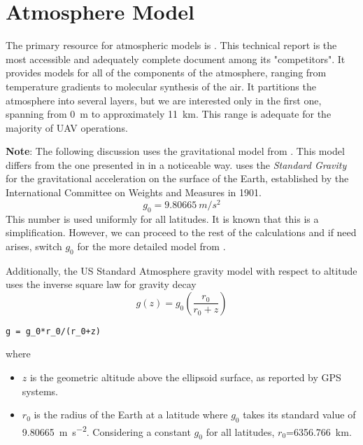 \section{Atmosphere Model}\label{sec:atm_model}
The primary resource for atmospheric models is \cite{USStdAtm76}. This technical report is the most accessible and adequately complete document among its "competitors". It provides models for all of the components of the atmosphere, ranging from temperature gradients to molecular synthesis of the air. It partitions the atmosphere into several layers, but we are interested only in the first one, spanning from \SI{0}{\m} to approximately \SI{11}{\kilo \m}. This range is adequate for the majority of UAV operations.

\textbf{Note}: The following discussion uses the gravitational model from \cite[eq.~17]{USStdAtm76}. This model differs from the one presented in \cite{Mulaire2000} in a noticeable way. \cite{USStdAtm76} uses the \emph{Standard Gravity} for the gravitational acceleration on the surface of the Earth, established by the International Committee on Weights and Measures in 1901.
\begin{equation} \label{eq:stdGravity}
	g_0 = 9.80665~ m/s^2
\end{equation}
This number is used uniformly for all latitudes. It is known that this is a simplification. However, we can proceed to the rest of the calculations and if need arises, switch $g_0$ for the more detailed model from \cite[eq.~4-1]{Mulaire2000}.

Additionally, the US Standard Atmosphere gravity model with respect to altitude uses the inverse square law for gravity decay
\begin{equation} \label{eq:usstdatmGravAlt}
	g(z) = g_0 \left(\frac{r_0}{r_0+z}\right)
\end{equation}

\begin{lstlisting}[style=C-style]
g = g_0*r_0/(r_0+z)
\end{lstlisting}

where
\begin{itemize}
	\item $z$ is the geometric altitude above the ellipsoid surface, as reported by GPS systems.
	\item $r_0$ is the radius of the Earth at a latitude where $g_0$ takes its standard value of \SI{9.80665}{\m \per \square \s}. Considering a constant $g_0$ for all latitudes, $r_0$=\SI{6356.766}{\kilo \meter}.
\end{itemize}

